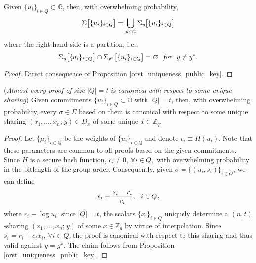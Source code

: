 \documentclass{iacrtrans}
\begin{document}
\begin{cor}\label{orst_validity_classes_prop}
Given $\{u_i\}_{i \in Q} \subset \mathbb{G}$,
then, with overwhelming probability,
\vspace{5pt}
\begin{equation}\label{orst_validity_classes_union}
\Sigma\big[\{u_i\}_{i \in Q}\big]
=
\bigcup_{y \in \mathbb{G}} \Sigma_y\big[\{u_i\}_{i \in Q}\big]
\vspace{3pt}
\end{equation}
where the right-hand side is a partition, i.e.,
\vspace{7pt}
\begin{equation*}
\Sigma_y\big[\{u_i\}_{i \in Q}\big]
\cap
\Sigma_{y^*}\big[\{u_i\}_{i \in Q}\big]
= \varnothing
\ \textit{ for }\ y \neq y^*.
\vspace{7pt}
\end{equation*}
\end{cor}

\begin{proof}
Direct consequence of Proposition \ref{orst_uniqueness_public_key}.
\end{proof}

\begin{prop}\label{orst_uniqueness_sharing}
\textup{(\textit{Almost every proof of size $|Q| = t$
is canonical with respect to some unique sharing})}
Given commitments
$\{u_i\}_{i \in Q} \subset \mathbb{G}$ with $|Q| = t$,
then, with overwhelming probability,
every $\sigma \in \Sigma$ based on them
is canonical with respect to some unique sharing
$(x_1, \dots, x_n;\hspace{1pt} y) \in D_x$
of some unique $x \in \mathbb{Z}_q$.
\end{prop}

\begin{proof}
Let $\{\mu_i\}_{i \in Q}$
be the weights of $\{u_i\}_{i \in Q}$
and denote $c_i \equiv H(u_i)$.
Note that these parameters
are common to all proofs based on the
given commitments.
Since $H$ is a secure hash function,
$c_i \neq 0,\hspace{2pt} \forall i \in Q,$
with overwhelming probability in
the bitlength of the group order.
Consequently, given $\sigma = \{(u_i, s_i)\}_{i \in Q}$,
we can define
\vspace{5pt}
\begin{equation*}
x_i = \frac{s_i - r_i}{c_i},
\ \ i \in Q\hspace{1pt},
\vspace{5pt}
\end{equation*}
where $r_i \equiv \log u_i$.
since $|Q| = t$, the scalars $\{x_i\}_{i \in Q}$
uniquely determine a $(n, t)$-sharing
$(x_1, \dots, x_n;\hspace{1pt} y)$
of some $x \in \mathbb{Z}_q$
by virtue of interpolation.
Since $s_i = r_i + c_i\hspace{1pt}x_i,\hspace{2pt}\forall i \in Q$,
the proof is canonical with respect to this sharing
and thus valid against $y = g ^ x$.
The claim follows from Proposition \ref{orst_uniqueness_public_key}.
\end{proof}
\end{document}
